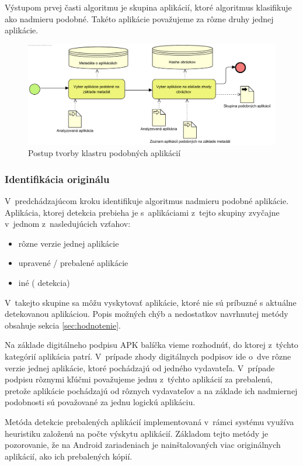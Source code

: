 Výstupom prvej časti algoritmu je skupina aplikácií, ktoré algoritmus klasifikuje ako nadmieru podobné. Takéto aplikácie považujeme za rôzne druhy jednej aplikácie.

\begin{figure}[htb]
  \begin{center}
    \includegraphics[width=130mm]{images/detection-cluster.png}
  \end{center}
  \caption{Postup tvorby klastru podobných aplikácií}
  \label{fig:detectionClustering}
\end{figure}
\subsubsection{\textbf{Identifikácia originálu}} 
V~predchádzajúcom kroku identifikuje algoritmus nadmieru podobné aplikácie. Aplikácia, ktorej detekcia prebieha je s~aplikáciami z~tejto skupiny zvyčajne v~jednom z~nasledujúcich vzťahov:
\begin{itemize}
	\item rôzne verzie jednej aplikácie
	\item upravené / prebalené aplikácie
	\item iné ( detekcia)
\end{itemize}
V~takejto skupine sa môžu vyskytovať aplikácie, ktoré nie sú príbuzné s aktuálne detekovanou aplikáciou. Popis možných chýb a nedostatkov navrhnutej metódy obsahuje sekcia \ref{sec:hodnotenie}.

Na základe digitálneho podpisu APK balíčka vieme rozhodnúť, do ktorej z~týchto kategórií aplikácia patrí. V~prípade zhody digitálnych podpisov ide o~dve rôzne verzie jednej aplikácie, ktoré pochádzajú od jedného vydavateľa. V~prípade podpisu rôznymi kľúčmi považujeme jednu z~týchto aplikácií za prebalenú, pretože aplikácie pochádzajú od rôznych vydavateľov a na základe ich nadmiernej podobnosti sú považované za jednu logickú aplikáciu.

Metóda detekcie prebalených aplikácií implementovaná v~rámci systému  využíva heuristiku založenú na počte výskytu aplikácií. Základom tejto metódy je pozorovanie, že na Android zariadeniach je nainštalovaných viac originálnych aplikácií, ako ich prebalených kópií.

